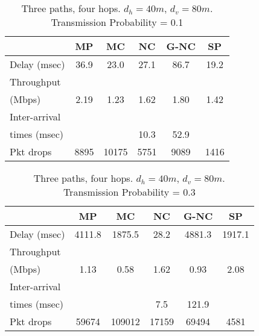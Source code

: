 \documentclass[journal, onecolumn, 12pt]{IEEEtran}
\begin{document}
\begin{table}[hb]
\begin{center}
\scriptsize
\begin{tabular}{|l|c|c|c|c|c|}
\hline
~                                    & MP & MC & NC & G-NC & SP \\ \hline
Delay (msec)   & 36.9  & 23.0  & 27.1  & 86.7 & 19.2  \\ \hline
Throughput                   & ~  & ~  & ~  & ~         & ~  \\
(Mbps)                   & 2.19  & 1.23  & 1.62 & 1.80 & 1.42 \\ \hline
Inter-arrival              & ~  & ~  & ~  & ~         & ~  \\
times (msec)   &   &   &  10.3 & 52.9 & \\ \hline
Pkt drops  & 8895  & 10175  & 5751  & 9089 & 1416 \\ \hline
\end{tabular}
\end{center}
\caption {Three paths, four hops. $d_{h}=40m$, $d_{v}=80m$. Transmission Probability = 0.1}
\label{tab:sim_topol_1_0.1}
\end{table}

\begin{table}[hb]
\begin{center}
\scriptsize
\begin{tabular}{|l|c|c|c|c|c|}
\hline
~                                    & MP & MC & NC & G-NC & SP \\ \hline
Delay (msec)   & 4111.8   & 1875.5 & 28.2 & 4881.3 & 1917.1 \\ \hline
Throughput                   & ~  & ~  & ~  & ~         & ~  \\
(Mbps)                   & 1.13  & 0.58  & 1.62 & 0.93 & 2.08 \\ \hline
Inter-arrival              & ~  & ~  & ~  & ~         & ~  \\
times (msec)   &   &   &  7.5 & 121.9 & \\ \hline
Pkt drops  & 59674  & 109012  & 17159  & 69494 & 4581 \\ \hline
\end{tabular}
\end{center}
\caption {Three paths, four hops. $d_{h}=40m$, $d_{v}=80m$. Transmission Probability = 0.3}
\label{tab:sim_topol_1_0.3}
\end{table}
\end{document}
